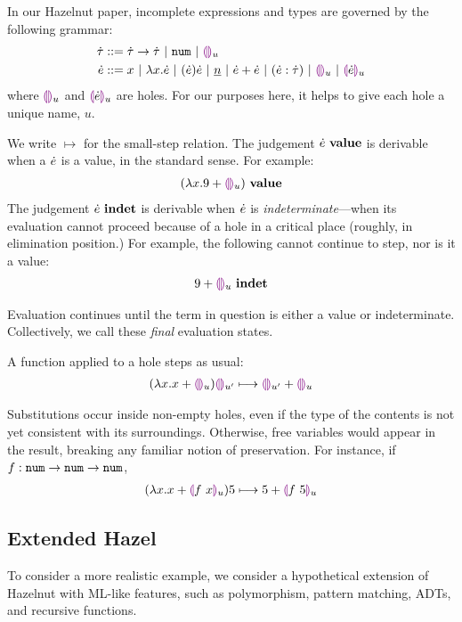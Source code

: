 
In our Hazelnut paper, incomplete expressions and types are governed by the following grammar:
\begin{align*}
  \dot{\tau} & ::=
  \dot{\tau} \rightarrow \dot{\tau} ~\vert~
  \texttt{num} ~\vert~
  \textcolor{violet}{\llparenthesis}\textcolor{violet}{\rrparenthesis}_{u}
  \\
  \dot{e} & ::=   x ~\vert~
  \lambda x.\dot{e} ~\vert~
  (\dot{e})\dot{e} ~\vert~
  \underline{n} ~\vert~
  \dot{e} + \dot{e} ~\vert~
  (\dot{e} : \dot{\tau}) ~\vert~
  \textcolor{violet}{\llparenthesis}\textcolor{violet}{\rrparenthesis}_{u} ~\vert~
  \textcolor{violet}{\llparenthesis}\dot{e}\textcolor{violet}{\rrparenthesis}_{u}
\end{align*}
where $\textcolor{violet}{\llparenthesis}\textcolor{violet}{\rrparenthesis}_{u}$ and $\textcolor{violet}{\llparenthesis}\dot{e}\textcolor{violet}{\rrparenthesis}_{u}$ are holes. For our purposes here, it helps to give each hole a unique name, $u$. 

We write $\mapsto$ for the
small-step relation. The judgement ${\dot{e}} ~\mathbf{value}$ is derivable when a
$\dot{e}$ is a value, in the standard sense. For example:
\begin{align*}
  {(\lambda x. 9 + \textcolor{violet}{\llparenthesis}\textcolor{violet}{\rrparenthesis}_{u})} ~\mathbf{value}
\end{align*} 
The judgement ${\dot{e}} ~\mathbf{indet}$ is
derivable when $\dot{e}$ is 
\textit{indeterminate}---when its evaluation cannot proceed because of a
hole in a critical place (roughly, in elimination position.) For example, the following cannot continue to step, nor is it a value:
\begin{align*}
  {9 + \textcolor{violet}{\llparenthesis}\textcolor{violet}{\rrparenthesis}_{u}} ~\mathbf{indet}
\end{align*}

Evaluation continues until the term in question is either a value or
indeterminate. Collectively, we call these \emph{final} evaluation states.

A function applied to a hole steps as usual:
\begin{align*}
      {
        (\lambda x.x + \textcolor{violet}{\llparenthesis}\textcolor{violet}{\rrparenthesis}_{u})\textcolor{violet}{\llparenthesis}\textcolor{violet}{\rrparenthesis}_{u'}
      } \longmapsto {
        \textcolor{violet}{\llparenthesis}\textcolor{violet}{\rrparenthesis}_{u'} + \textcolor{violet}{\llparenthesis}\textcolor{violet}{\rrparenthesis}_{u}
      }
\end{align*}

Substitutions occur inside non-empty holes, even if the type of the
contents is not yet consistent with its surroundings. Otherwise, free
variables would appear in the result, breaking any familiar notion of
preservation. For instance, if $f : \texttt{num} \rightarrow \texttt{num} \rightarrow \texttt{num}$,
\begin{align*}
  {
        (\lambda x.x + \textcolor{violet}{\llparenthesis}f~x\textcolor{violet}{\rrparenthesis}_{u})5
      } \longmapsto {
        5 + \textcolor{violet}{\llparenthesis}f~5\textcolor{violet}{\rrparenthesis}_{u}
      }
\end{align*}

\subsection{Extended Hazel}
To consider a more realistic example, we consider a hypothetical extension of Hazelnut with ML-like features, such as polymorphism, pattern matching, ADTs, and recursive functions.

